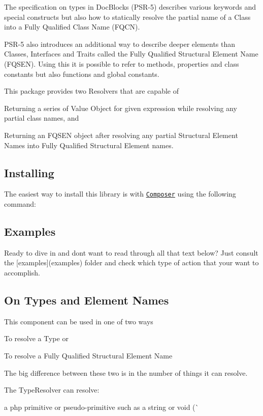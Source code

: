 The specification on types in Doc\+Blocks (P\+S\+R-\/5) describes various keywords and special constructs but also how to statically resolve the partial name of a Class into a Fully Qualified Class Name (F\+Q\+CN).

P\+S\+R-\/5 also introduces an additional way to describe deeper elements than Classes, Interfaces and Traits called the Fully Qualified Structural Element Name (F\+Q\+S\+EN). Using this it is possible to refer to methods, properties and class constants but also functions and global constants.

This package provides two Resolvers that are capable of


\begin{DoxyEnumerate}
\item Returning a series of Value Object for given expression while resolving any partial class names, and
\item Returning an F\+Q\+S\+EN object after resolving any partial Structural Element Names into Fully Qualified Structural Element names.
\end{DoxyEnumerate}

\subsection*{Installing}

The easiest way to install this library is with \href{https://getcomposer.org}{\tt Composer} using the following command\+: 


\subsection*{Examples}

Ready to dive in and don\textquotesingle{}t want to read through all that text below? Just consult the \mbox{[}examples\mbox{]}(examples) folder and check which type of action that your want to accomplish.

\subsection*{On Types and Element Names}

This component can be used in one of two ways


\begin{DoxyEnumerate}
\item To resolve a Type or
\item To resolve a Fully Qualified Structural Element Name
\end{DoxyEnumerate}

The big difference between these two is in the number of things it can resolve.

The Type\+Resolver can resolve\+:


\begin{DoxyItemize}
\item a php primitive or pseudo-\/primitive such as a string or void (\`{} 
\end{DoxyItemize}